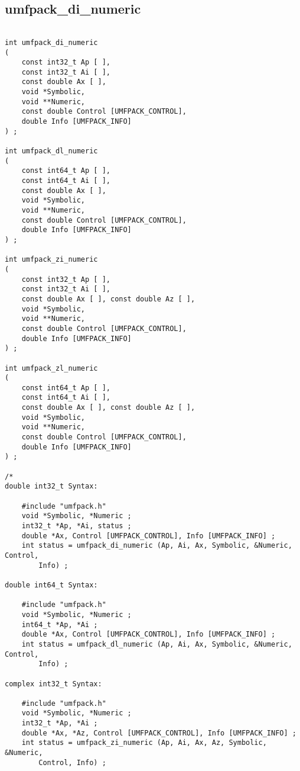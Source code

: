 \documentclass[11pt]{article}
\begin{document}
\newpage
\subsection{umfpack\_di\_numeric}

{\footnotesize
\begin{verbatim}

int umfpack_di_numeric
(
    const int32_t Ap [ ],
    const int32_t Ai [ ],
    const double Ax [ ],
    void *Symbolic,
    void **Numeric,
    const double Control [UMFPACK_CONTROL],
    double Info [UMFPACK_INFO]
) ;

int umfpack_dl_numeric
(
    const int64_t Ap [ ],
    const int64_t Ai [ ],
    const double Ax [ ],
    void *Symbolic,
    void **Numeric,
    const double Control [UMFPACK_CONTROL],
    double Info [UMFPACK_INFO]
) ;

int umfpack_zi_numeric
(
    const int32_t Ap [ ],
    const int32_t Ai [ ],
    const double Ax [ ], const double Az [ ],
    void *Symbolic,
    void **Numeric,
    const double Control [UMFPACK_CONTROL],
    double Info [UMFPACK_INFO]
) ;

int umfpack_zl_numeric
(
    const int64_t Ap [ ],
    const int64_t Ai [ ],
    const double Ax [ ], const double Az [ ],
    void *Symbolic,
    void **Numeric,
    const double Control [UMFPACK_CONTROL],
    double Info [UMFPACK_INFO]
) ;

/*
double int32_t Syntax:

    #include "umfpack.h"
    void *Symbolic, *Numeric ;
    int32_t *Ap, *Ai, status ;
    double *Ax, Control [UMFPACK_CONTROL], Info [UMFPACK_INFO] ;
    int status = umfpack_di_numeric (Ap, Ai, Ax, Symbolic, &Numeric, Control,
        Info) ;

double int64_t Syntax:

    #include "umfpack.h"
    void *Symbolic, *Numeric ;
    int64_t *Ap, *Ai ;
    double *Ax, Control [UMFPACK_CONTROL], Info [UMFPACK_INFO] ;
    int status = umfpack_dl_numeric (Ap, Ai, Ax, Symbolic, &Numeric, Control,
        Info) ;

complex int32_t Syntax:

    #include "umfpack.h"
    void *Symbolic, *Numeric ;
    int32_t *Ap, *Ai ;
    double *Ax, *Az, Control [UMFPACK_CONTROL], Info [UMFPACK_INFO] ;
    int status = umfpack_zi_numeric (Ap, Ai, Ax, Az, Symbolic, &Numeric,
        Control, Info) ;


\end{verbatim}}
\end{document}
